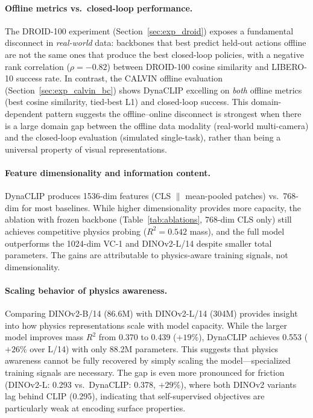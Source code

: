 \documentclass{article}
\newcommand{\methodname}{DynaCLIP}
\begin{document}
\paragraph{Offline metrics vs.\ closed-loop performance.}
The DROID-100 experiment (Section~\ref{sec:exp_droid}) exposes a fundamental disconnect in \emph{real-world} data: backbones that best predict held-out actions offline are not the same ones that produce the best closed-loop policies, with a negative rank correlation ($\rho{=}-0.82$) between DROID-100 cosine similarity and LIBERO-10 success rate. In contrast, the CALVIN offline evaluation (Section~\ref{sec:exp_calvin_bc}) shows \methodname{} excelling on \emph{both} offline metrics (best cosine similarity, tied-best L1) and closed-loop success. This domain-dependent pattern suggests the offline--online disconnect is strongest when there is a large domain gap between the offline data modality (real-world multi-camera) and the closed-loop evaluation (simulated single-task), rather than being a universal property of visual representations.

\paragraph{Feature dimensionality and information content.}
\methodname{} produces 1536-dim features (CLS $\|$ mean-pooled patches) vs.\ 768-dim for most baselines. While higher dimensionality provides more capacity, the ablation with frozen backbone (Table~\ref{tab:ablations}, 768-dim CLS only) still achieves competitive physics probing ($R^2{=}0.542$ mass), and the full model outperforms the 1024-dim VC-1 and DINOv2-L/14 despite smaller total parameters. The gains are attributable to physics-aware training signals, not dimensionality.

\paragraph{Scaling behavior of physics awareness.}
Comparing DINOv2-B/14 (86.6M) with DINOv2-L/14 (304M) provides insight into how physics representations scale with model capacity. While the larger model improves mass $R^2$ from 0.370 to 0.439 ($+19\%$), \methodname{} achieves 0.553 ($+26\%$ over L/14) with only 88.2M parameters. This suggests that physics awareness cannot be fully recovered by simply scaling the model---specialized training signals are necessary. The gap is even more pronounced for friction (DINOv2-L: 0.293 vs.\ \methodname{}: 0.378, $+29\%$), where both DINOv2 variants lag behind CLIP (0.295), indicating that self-supervised objectives are particularly weak at encoding surface properties.
\end{document}
